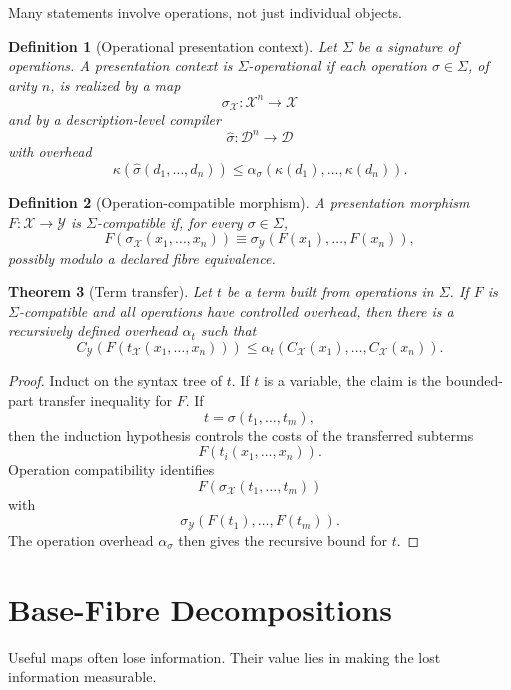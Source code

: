 \documentclass[11pt]{article}
\newtheorem{theorem}{Theorem}[section]
\newtheorem{definition}[theorem]{Definition}
\begin{document}
Many statements involve operations, not just individual objects.

\begin{definition}[Operational presentation context]
Let \(\Sigma\) be a signature of operations. A presentation context is \(\Sigma\)-operational if each operation \(\sigma\in\Sigma\), of arity \(n\), is realized by a map
\[
\sigma_\mathcal X:\mathcal X^n\to\mathcal X
\]
and by a description-level compiler
\[
\widehat\sigma:\mathcal D^n\to\mathcal D
\]
with overhead
\[
\kappa(\widehat\sigma(d_1,\ldots,d_n))
\leq
\alpha_\sigma(\kappa(d_1),\ldots,\kappa(d_n)).
\]
\end{definition}

\begin{definition}[Operation-compatible morphism]
A presentation morphism \(F:\mathcal X\to\mathcal Y\) is \(\Sigma\)-compatible if, for every \(\sigma\in\Sigma\),
\[
F(\sigma_\mathcal X(x_1,\ldots,x_n))
\equiv
\sigma_\mathcal Y(F(x_1),\ldots,F(x_n)),
\]
possibly modulo a declared fibre equivalence.
\end{definition}

\begin{theorem}[Term transfer]
Let \(t\) be a term built from operations in \(\Sigma\). If \(F\) is \(\Sigma\)-compatible and all operations have controlled overhead, then there is a recursively defined overhead \(\alpha_t\) such that
\[
C_\mathcal Y(F(t_\mathcal X(x_1,\ldots,x_n)))
\leq
\alpha_t(C_\mathcal X(x_1),\ldots,C_\mathcal X(x_n)).
\]
\end{theorem}

\begin{proof}
Induct on the syntax tree of \(t\). If \(t\) is a variable, the claim is the bounded-part transfer inequality for \(F\). If
\[
t=\sigma(t_1,\ldots,t_m),
\]
then the induction hypothesis controls the costs of the transferred subterms
\[
F(t_i(x_1,\ldots,x_n)).
\]
Operation compatibility identifies
\[
F(\sigma_\mathcal X(t_1,\ldots,t_m))
\]
with
\[
\sigma_\mathcal Y(F(t_1),\ldots,F(t_m)).
\]
The operation overhead \(\alpha_\sigma\) then gives the recursive bound for \(t\).
\end{proof}

\section{Base-Fibre Decompositions}

Useful maps often lose information. Their value lies in making the lost information measurable.
\end{document}
